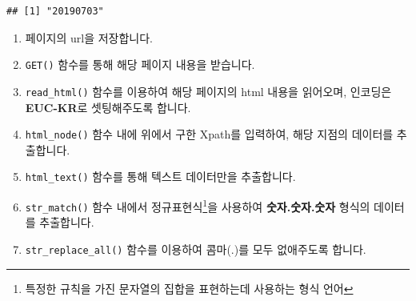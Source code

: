 \documentclass[12pt,]{book}
\newenvironment{Shaded}{\begin{snugshade}}{\end{snugshade}}
\newcommand{\CharTok}[1]{\textcolor[rgb]{0.31,0.60,0.02}{#1}}
\newcommand{\DataTypeTok}[1]{\textcolor[rgb]{0.13,0.29,0.53}{#1}}
\newcommand{\KeywordTok}[1]{\textcolor[rgb]{0.13,0.29,0.53}{\textbf{#1}}}
\newcommand{\NormalTok}[1]{#1}
\newcommand{\OperatorTok}[1]{\textcolor[rgb]{0.81,0.36,0.00}{\textbf{#1}}}
\newcommand{\StringTok}[1]{\textcolor[rgb]{0.31,0.60,0.02}{#1}}
\providecommand{\tightlist}{%
  \setlength{\itemsep}{0pt}\setlength{\parskip}{0pt}}
\let\rmarkdownfootnote\footnote%
\def\footnote{\protect\rmarkdownfootnote}
\begin{document}
\begin{Shaded}
\end{Shaded}

\begin{verbatim}
## [1] "20190703"
\end{verbatim}

\begin{enumerate}
\def\labelenumi{\arabic{enumi}.}
\tightlist
\item
  페이지의 url을 저장합니다.
\item
  \texttt{GET()} 함수를 통해 해당 페이지 내용을 받습니다.
\item
  \texttt{read\_html()} 함수를 이용하여 해당 페이지의 html 내용을 읽어오며, 인코딩은 \textbf{EUC-KR}로 셋팅해주도록 합니다.
\item
  \texttt{html\_node()} 함수 내에 위에서 구한 Xpath를 입력하여, 해당 지점의 데이터를 추출합니다.
\item
  \texttt{html\_text()} 함수를 통해 텍스트 데이터만을 추출합니다.
\item
  \texttt{str\_match()} 함수 내에서 정규표현식\footnote{특정한 규칙을 가진 문자열의 집합을 표현하는데 사용하는 형식 언어}을 사용하여 \textbf{숫자.숫자.숫자} 형식의 데이터를 추출합니다.
\item
  \texttt{str\_replace\_all()} 함수를 이용하여 콤마(.)를 모두 없애주도록 합니다.
\end{enumerate}
\end{document}
